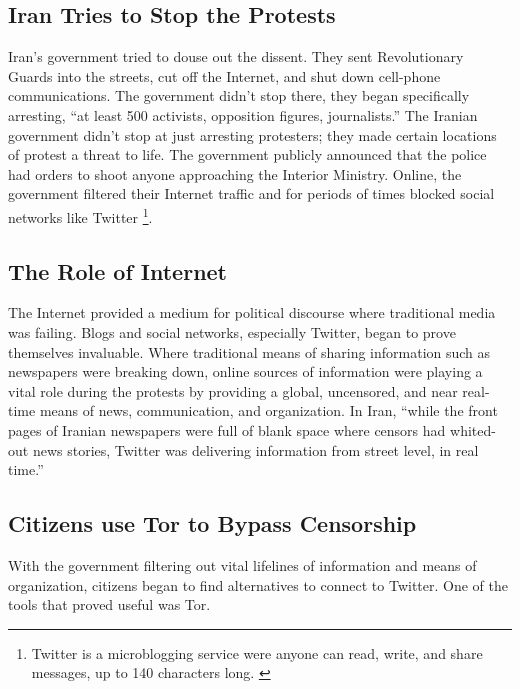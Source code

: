 \documentclass[11pt]{article}
\begin{document}
\begin{multicols}{2}
\subsection{Iran Tries to Stop the Protests}

Iran's government tried to douse out the dissent. They sent
Revolutionary Guards into the streets, cut off the Internet, and shut down
cell-phone communications. \cite{TheIranianVote} The government didn't stop
there, they began specifically arresting, ``at least 500 activists,
opposition figures, journalists.'' \cite{IranProtestsFifthDayOfUnrest} The
Iranian government didn't stop at just arresting protesters; they made certain
locations of protest a threat to life. The government publicly announced that
the police had orders to shoot anyone approaching the Interior Ministry.
\cite{TheIranianVote} Online, the government filtered their Internet traffic and
for periods of times blocked social networks like Twitter \footnote{Twitter is a
microblogging service were anyone can read, write, and share messages, up to 140
characters long.  \cite{WhatIsTwitter}}.  \cite{IranBlocksFacebookTwitter}

\subsection{The Role of Internet}

The Internet provided a medium for political discourse where traditional media
was failing. Blogs and social networks, especially Twitter, began to prove
themselves invaluable.  Where traditional means of sharing information such as
newspapers were breaking down, online sources of information were playing a
vital role during the protests by providing a global, uncensored, and near
real-time means of news, communication, and organization.  In Iran, ``while the
front pages of Iranian newspapers were full of blank space where censors had
whited-out news stories, Twitter was delivering information from street level,
in real time.'' \cite{WhyTwitterIsTheMedium}

\subsection{Citizens use Tor to Bypass Censorship}

With the government filtering out vital lifelines of information and means of
organization, citizens began to find alternatives to connect to Twitter.
\cite{FindingWayAroundIranianCensorship} One of the tools that proved useful was
Tor.


\end{multicols}
\end{document}
